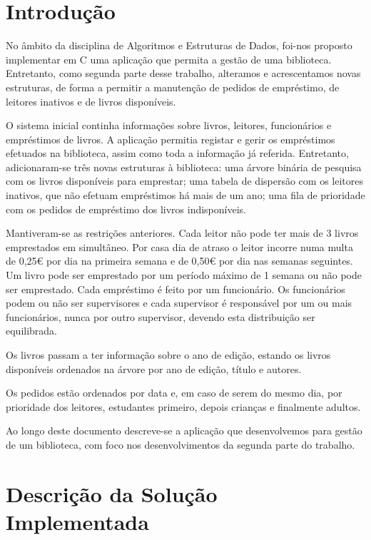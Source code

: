 \documentclass[12pt,a4paper,reqno]{report}
\numberwithin{figure}{section}
\numberwithin{equation}{section}
\def\Cpp{C\raisebox{0.5ex}{\tiny\textbf{++}}}
\begin{document}


\tableofcontents

\chapter{Introdução}

No âmbito da disciplina de Algoritmos e Estruturas de Dados, foi-nos proposto implementar em \Cpp{} uma aplicação que permita a gestão de uma biblioteca. Entretanto, como segunda parte desse trabalho, alteramos e acrescentamos novas estruturas, de forma a permitir a manutenção de pedidos de empréstimo, de leitores inativos e de livros disponíveis.

O sistema inicial continha informações sobre livros, leitores, funcionários e empréstimos de livros. A aplicação permitia registar e gerir os empréstimos efetuados na biblioteca, assim como toda a informação já referida. Entretanto, adicionaram-se três novas estruturas à biblioteca: uma árvore binária de pesquisa com os livros disponíveis para emprestar; uma tabela de dispersão com os leitores inativos, que não efetuam empréstimos há mais de um ano; uma fila de prioridade com os pedidos de empréstimo dos livros indisponíveis.

Mantiveram-se as restrições anteriores. Cada leitor não pode ter mais de 3 livros emprestados em simultâneo. Por casa dia de atraso o leitor incorre numa multa de 0,25\euro{} por dia na primeira semana e de 0,50\euro{} por dia nas semanas seguintes. Um livro pode ser emprestado por um período máximo de 1 semana ou não pode ser emprestado. Cada empréstimo é feito por um funcionário. Os funcionários podem ou não ser supervisores e cada supervisor é responsável por um ou mais funcionários, nunca por outro supervisor, devendo esta distribuição ser equilibrada.

Os livros passam a ter informação sobre o ano de edição, estando os livros disponíveis ordenados na árvore por ano de edição, título e autores.

Os pedidos estão ordenados por data e, em caso de serem do mesmo dia, por prioridade dos leitores, estudantes primeiro, depois crianças e finalmente adultos.

Ao longo deste documento descreve-se a aplicação que desenvolvemos para gestão de um biblioteca, com foco nos desenvolvimentos da segunda parte do trabalho.

\chapter{Descrição da Solução Implementada}
\end{document}

